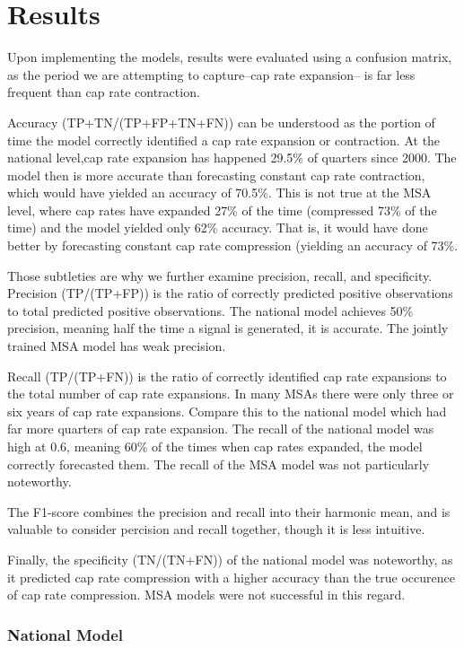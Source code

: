 \section{Results}

Upon implementing the models, results were evaluated using a confusion matrix, as the period we are attempting to capture--cap rate expansion-- is far less frequent than cap rate contraction. 

Accuracy (TP+TN/(TP+FP+TN+FN)) can be understood as the portion of time the model correctly identified a cap rate expansion or contraction. At the national level,cap rate expansion has happened 29.5\% of quarters since 2000. The model then is more accurate than forecasting constant cap rate contraction, which would have yielded an accuracy of 70.5\%. This is not true at the MSA level, where cap rates have expanded 27\% of the time (compressed 73\% of the time) and the model yielded only 62\% accuracy. That is, it would have done better by forecasting constant cap rate compression (yielding an accuracy of 73\%.

Those subtleties are why we further examine precision, recall, and specificity. Precision (TP/(TP+FP)) is the ratio of correctly predicted positive observations to total predicted positive observations. The national model achieves 50\% precision, meaning half the time a signal is generated, it is accurate. The jointly trained MSA model has weak precision. 

Recall (TP/(TP+FN)) is the ratio of correctly identified cap rate expansions to the total number of cap rate expansions. In many MSAs there were only three or six years of cap rate expansions. Compare this to the national model which had far more quarters of cap rate expansion. The recall of the national model was high at 0.6, meaning 60\% of the times when cap rates expanded, the model correctly forecasted them. The recall of the MSA model was not particularly noteworthy.

The F1-score combines the precision and recall into their harmonic mean, and is valuable to consider percision and recall together, though it is less intuitive. 

Finally, the specificity (TN/(TN+FN)) of the national model was noteworthy, as it predicted cap rate compression with a higher accuracy than the true occurence of cap rate compression. MSA models were not successful in this regard. 

\subsubsection{National Model}

